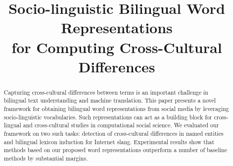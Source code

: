 \documentclass[11pt,letterpaper]{article}
\title{Socio-linguistic Bilingual Word Representations \\for Computing Cross-Cultural Differences}
\author{}
\begin{document}
\maketitle
\begin{abstract} 
Capturing cross-cultural differences between terms is an important challenge in bilingual text understanding
and machine translation. This paper presents a novel framework for obtaining bilingual
word representations from social media by leveraging socio-linguistic vocabularies. 
Such representations can act as a building block for cross-lingual and cross-cultural studies in computational social science.
We evaluated our framework on two such tasks: detection of cross-cultural differences in named entities
and bilingual lexicon induction for Internet slang. Experimental results show that methods based on our proposed word representations outperform a number of baseline methods by substantial margins.
\end{abstract}
\begin{CJK}{UTF8}{gbsn}









\end{CJK}
\end{document}

